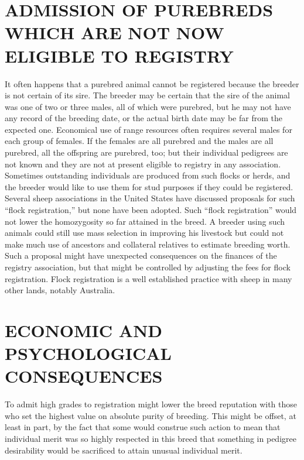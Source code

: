 \section*{ADMISSION OF PUREBREDS WHICH ARE NOT NOW ELIGIBLE TO REGISTRY}

It often happens that a purebred animal cannot be registered
because the breeder is not certain of its sire. The breeder may be certain
that the sire of the animal was one of two or three males, all of
which were purebred, but he may not have any record of the breeding
date, or the actual birth date may be far from the expected one. Economical
use of range resources often requires several males for each
group of females. If the females are all purebred and the males are all
purebred, all the offspring are purebred, too; but their individual
pedigrees are not known and they are not at present eligible to registry
in any association. Sometimes outstanding individuals are produced
from such flocks or herds, and the breeder would like to use them for
stud purposes if they could be registered. Several sheep associations in
the United States have discussed proposals for such 
``flock registration,''
but none have been adopted. Such ``flock registration'' would not lower
the homozygosity so far attained in the breed. A breeder using such animals
could still use mass selection in improving his livestock but could
not make much use of ancestors and collateral relatives to estimate
breeding worth. Such a proposal might have unexpected consequences
on the finances of the registry association, but that might be controlled
by adjusting the fees for flock registration. Flock registration is a well
established practice with sheep in many other lands, notably Australia.

\section*{ECONOMIC AND PSYCHOLOGICAL CONSEQUENCES}

To admit high grades to registration might lower the breed reputation
with those who set the highest value on absolute purity of breeding.
This might be offset, at least in part, by the fact that some would
construe such action to mean that individual merit was so highly
respected in this breed that something in pedigree desirability would
be sacrificed to attain unusual individual merit.

